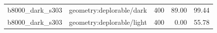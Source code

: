 \begin{longtable}{l>{\raggedright\arraybackslash}p{.42\linewidth}rrr}
b8000\_\allowbreak{}dark\_\allowbreak{}s303 & %
geometry:deplorable/dark & %
400 & %
89.00 & %
99.44 \\ %

b8000\_\allowbreak{}dark\_\allowbreak{}s303 & %
geometry:deplorable/light & %
400 & %
0.00 & %
55.78 \\ %


\end{longtable}
